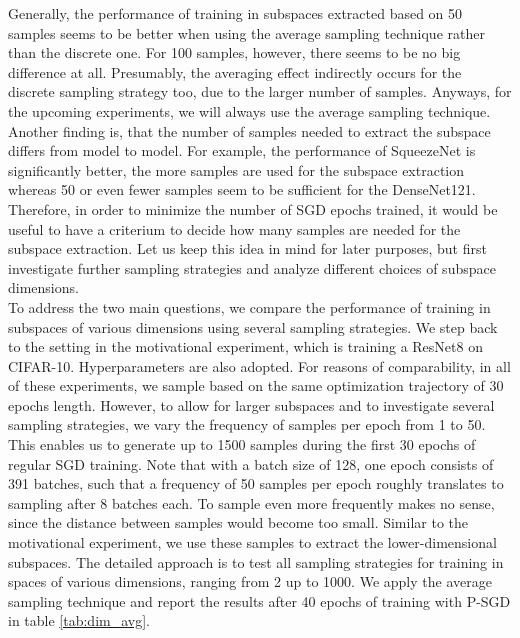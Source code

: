 \documentclass[11pt, a4paper]{article}
\begin{document}
Generally, the performance of training in subspaces extracted based on 50 samples seems to be better when using the average sampling technique rather than the discrete one. For 100 samples, however, there seems to be no big difference at all. Presumably, the averaging effect indirectly occurs for the discrete sampling strategy too, due to the larger number of samples. Anyways, for the upcoming experiments, we will always use the average sampling technique. Another finding is, that the number of samples needed to extract the subspace differs from model to model. For example, the performance of SqueezeNet is significantly better, the more samples are used for the subspace extraction whereas 50 or even fewer samples seem to be sufficient for the DenseNet121. Therefore, in order to minimize the number of SGD epochs trained, it would be useful to have a criterium to decide how many samples are needed for the subspace extraction. Let us keep this idea in mind for later purposes, but first investigate further sampling strategies and analyze different choices of subspace dimensions. \\

To address the two main questions, we compare the performance of training in subspaces of various dimensions using several sampling strategies. We step back to the setting in the motivational experiment, which is training a ResNet8 on CIFAR-10. Hyperparameters are also adopted. For reasons of comparability, in all of these experiments, we sample based on the same optimization trajectory of 30 epochs length. However, to allow for larger subspaces and to investigate several sampling strategies, we vary the frequency of samples per epoch from 1 to 50. This enables us to generate up to 1500 samples during the first 30 epochs of regular SGD training. Note that with a batch size of 128, one epoch consists of 391 batches, such that a frequency of 50 samples per epoch roughly translates to sampling after 8 batches each. To sample even more frequently makes no sense, since the distance between samples would become too small. Similar to the motivational experiment, we use these samples to extract the lower-dimensional subspaces. The detailed approach is to test all sampling strategies for training in spaces of various dimensions, ranging from 2 up to 1000. We apply the average sampling technique and report the results after 40 epochs of training with P-SGD in table \ref{tab:dim_avg}.
\end{document}
